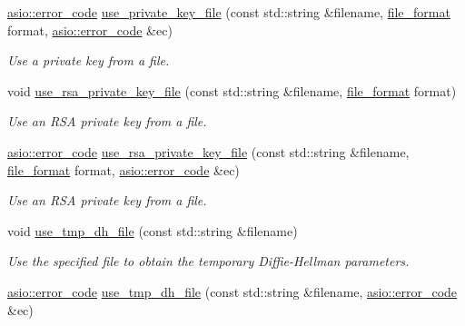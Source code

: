 \begin{DoxyCompactItemize}
\hyperlink{classasio_1_1error__code}{asio\+::error\+\_\+code} \hyperlink{classasio_1_1ssl_1_1old_1_1basic__context_a200c534538a776d07d4183d1b7ba86c6}{use\+\_\+private\+\_\+key\+\_\+file} (const std\+::string \&filename, \hyperlink{classasio_1_1ssl_1_1context__base_acc846aa73fffcab1fecad36dcf2be1fb}{file\+\_\+format} format, \hyperlink{classasio_1_1error__code}{asio\+::error\+\_\+code} \&ec)
\begin{DoxyCompactList}\small\item\em Use a private key from a file. \end{DoxyCompactList}\item 
void \hyperlink{classasio_1_1ssl_1_1old_1_1basic__context_a7357b04bf3378b150fb237b91d99d414}{use\+\_\+rsa\+\_\+private\+\_\+key\+\_\+file} (const std\+::string \&filename, \hyperlink{classasio_1_1ssl_1_1context__base_acc846aa73fffcab1fecad36dcf2be1fb}{file\+\_\+format} format)
\begin{DoxyCompactList}\small\item\em Use an R\+S\+A private key from a file. \end{DoxyCompactList}\item 
\hyperlink{classasio_1_1error__code}{asio\+::error\+\_\+code} \hyperlink{classasio_1_1ssl_1_1old_1_1basic__context_a370c2be3ef66c7bc0edad184e252b610}{use\+\_\+rsa\+\_\+private\+\_\+key\+\_\+file} (const std\+::string \&filename, \hyperlink{classasio_1_1ssl_1_1context__base_acc846aa73fffcab1fecad36dcf2be1fb}{file\+\_\+format} format, \hyperlink{classasio_1_1error__code}{asio\+::error\+\_\+code} \&ec)
\begin{DoxyCompactList}\small\item\em Use an R\+S\+A private key from a file. \end{DoxyCompactList}\item 
void \hyperlink{classasio_1_1ssl_1_1old_1_1basic__context_a08bad4b2b690d97188a5fe1184bd9913}{use\+\_\+tmp\+\_\+dh\+\_\+file} (const std\+::string \&filename)
\begin{DoxyCompactList}\small\item\em Use the specified file to obtain the temporary Diffie-\/\+Hellman parameters. \end{DoxyCompactList}\item 
\hyperlink{classasio_1_1error__code}{asio\+::error\+\_\+code} \hyperlink{classasio_1_1ssl_1_1old_1_1basic__context_a4b20c09d1c8c16e8722ad1d267509b22}{use\+\_\+tmp\+\_\+dh\+\_\+file} (const std\+::string \&filename, \hyperlink{classasio_1_1error__code}{asio\+::error\+\_\+code} \&ec)

\end{DoxyCompactItemize}
